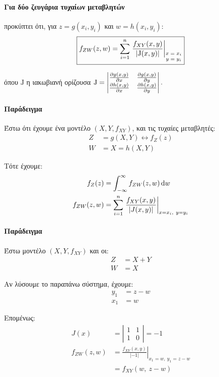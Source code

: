 \documentclass[11pt,a4paper,notitlepage,fleqn,final]{article}
\begin{document}
	\paragraph{Για δύο ζευγάρια τυχαίων μεταβλητών}
	προκύπτει ότι, για \( z=g(x_i,y_i) \) και \( w=h(x_i,y_i) \):
	\[
	\boxed{
		f_{ZW}(z,w) = \sum_{i=1}^{n} \left.
		\frac{f_{XY}(x,y)}{\left|\mathrm J(x,y)\right|}
		\right|_{\scriptsize \begin{matrix}
			x=x_i \\ y=y_i
			\end{matrix}}
		}
	\]

	όπου \( \mathrm J \) η ιακωβιανή ορίζουσα \(
	\mathrm J = \left|\begin{matrix}
	\pd{g(x,y)}{x} & \pd{g(x,y)}{y} \\
	\pd{h(x,y)}{x} & \pd{h(x,y)}{y}
	\end{matrix}\right|.
	 \)

	\paragraph{Παράδειγμα}
	Έστω ότι έχουμε ένα μοντέλο \( \left(X,Y,f_{XY}\right) \), και τις
	τυχαίες μεταβλητές:
	\begin{align*}
		Z &= g(X,Y) \leftrightarrow f_Z(z) \\
		W &= X = h(X,Y)
	\end{align*}

	Τότε έχουμε:
	\begin{align*}
	    f_Z(z) &= \int_{-\infty}^{\infty} f_{ZW}(z,w)\mathop{}\!\mathrm{d} w\\
		f_{ZW}(z,w) &= \sum_{i=1}^{n} \left.
		\frac{f_{XY}(x,y)}{\left|J(x,y)\right|} \right|_{x=x_i,\ y=y_i}
	\end{align*}

	\paragraph{Παράδειγμα}
	Έστω μοντέλο \( \left(X,Y,f_{XY}\right) \) και οι:
	\begin{align*}
		Z &= X+Y \\
		W &= X
	\end{align*}

	Αν λύσουμε το παραπάνω σύστημα, έχουμε:
	\begin{align*}
		y_1 &= z-w \\
		x_1 &= w
	\end{align*}

	Επομένως:
	\begin{align*}
		J(x) &= \left|\begin{matrix}
		1 & 1 \\ 1 & 0
		\end{matrix}\right| = -1\\
		f_{ZW}(z,w) &= \left. \frac{f_{XY}(x,y)}{|-1|}
		\right|_{x_1=w,\ y_1=z-w} \\ &= f_{XY}(w,\ z-w)
	\end{align*}
\end{document}
